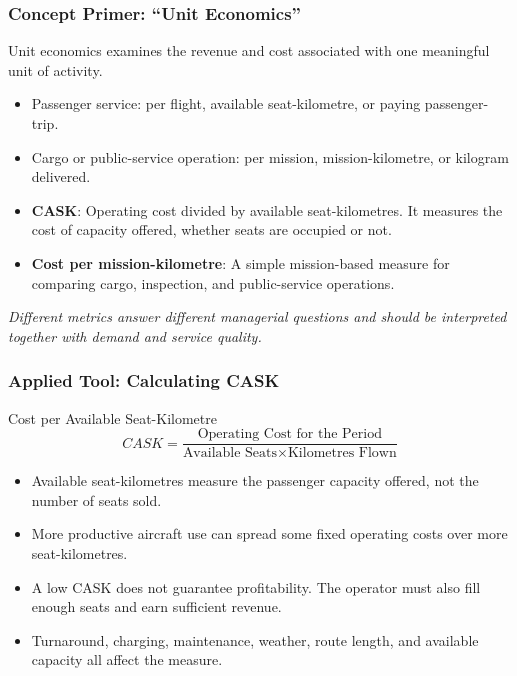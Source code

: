 \documentclass{beamer}
\begin{document}
\begin{frame}[t]
  \frametitle{Concept Primer: ``Unit Economics''}
  Unit economics examines the revenue and cost associated with one meaningful unit of activity.
  \begin{itemize}
    \item Passenger service: per flight, available seat-kilometre, or paying passenger-trip.
    \item Cargo or public-service operation: per mission, mission-kilometre, or kilogram delivered.
  \end{itemize}
  \vspace{0.25cm}
  \begin{itemize}
    \item \textbf{CASK}: Operating cost divided by available seat-kilometres. It measures the cost of capacity offered, whether seats are occupied or not.
    \item \textbf{Cost per mission-kilometre}: A simple mission-based measure for comparing cargo, inspection, and public-service operations.
  \end{itemize}
  \textit{Different metrics answer different managerial questions and should be interpreted together with demand and service quality.}
\end{frame}

\begin{frame}[t]
  \frametitle{Applied Tool: Calculating CASK}
  \begin{block}{Cost per Available Seat-Kilometre}
  \[
    CASK=\frac{\text{Operating Cost for the Period}}{\text{Available Seats}\times\text{Kilometres Flown}}
  \]
  \end{block}
  \begin{itemize}
    \item Available seat-kilometres measure the passenger capacity offered, not the number of seats sold.
    \item More productive aircraft use can spread some fixed operating costs over more seat-kilometres.
    \item A low CASK does not guarantee profitability. The operator must also fill enough seats and earn sufficient revenue.
    \item Turnaround, charging, maintenance, weather, route length, and available capacity all affect the measure.
  \end{itemize}
\end{frame}
\end{document}
